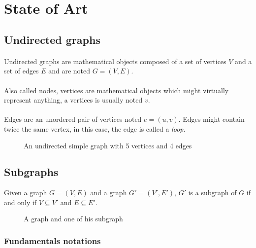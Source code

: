 \section{State of Art}

\subsection{Undirected graphs}

\paragraph{}
Undirected graphs are mathematical objects composed of a set of vertices $V$
and a set of edges $E$ and are noted $G = (V,E)$.

\paragraph{}
Also called nodes, vertices are mathematical objects which might virtually
represent anything, a vertices is usually noted $v$.

\paragraph{}
Edges are an unordered pair of vertices noted $e = (u,v)$. Edges might
contain twice the same vertex, in this case, the edge is called a {\em loop}.

\begin{figure}[!h]
  \begin{center}
    
  \end{center}
  \caption{An undirected simple graph with 5 vertices and 4 edges}
\end{figure}

\subsection{Subgraphs}
Given a graph $G = (V,E)$ and a graph $G' = (V',E')$, $G'$ is a subgraph of $G$ if and only if $V \subseteq V'$ and $E \subseteq E'$.

\begin{figure}[!h]
  \begin{center}
    
  \end{center}
  \caption{A graph and one of his subgraph}
\end{figure}


\subsubsection{Fundamentals notations}

